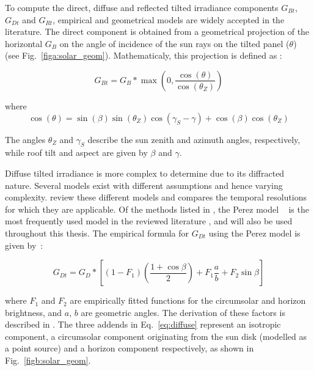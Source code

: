 To compute the direct, diffuse and reflected tilted irradiance components $G_{Bt}$, $G_{Dt}$ and $G_{Rt}$, empirical and geometrical models are widely accepted in the literature. 
The direct component is obtained from a geometrical projection of the horizontal $G_B$ on the angle of incidence of the sun rays on the tilted panel ($\theta$) (see Fig.~\ref{figa:solar_geom}). Mathematicaly, this projection is defined as \cite{gulin_estimation_2013}:

\begin{equation}
\label{eq:direct}
    G_{Bt} = G_{B} * \max \left( 0, \frac{\cos(\theta)}{\cos(\theta_Z)} \right)
\end{equation}

where
\begin{equation}
\label{eq:dir_angle}
\cos(\theta) = \sin(\beta) \sin(\theta_Z) \cos(\gamma_S - \gamma) + \cos(\beta) \cos(\theta_Z) 
\end{equation}

The angles $\theta_Z$ and $\gamma_S$ describe the sun zenith and azimuth angles, respectively, while roof tilt and aspect are given by $\beta$ and $\gamma$.

Diffuse tilted irradiance is more complex to determine due to its diffracted nature. Several models exist with different assumptions and hence varying complexity. \citet{assouline_estimation_2017} review these different models and compares the temporal resolutions for which they are applicable.
Of the methods listed in \citet{assouline_estimation_2017} , the Perez model ~\cite{perez_modeling_1990} is the most frequently used model in the reviewed literature \cite{buffat_scalable_2018,jakubiec_method_2013,mainzer_assessment_2017,wegertseder_combining_2016}, and will also be used throughout this thesis.
The empirical formula for $G_{Dt}$ using the Perez model is given by~\cite{perez_modeling_1990}:

\begin{equation}
\label{eq:diffuse}
G_{Dt} = G_D * \left[ (1 - F_1) \left( \frac{1 + \cos \beta}{2} \right) 
       + F_1 \frac{ a }{ b }
       + F_2 \sin \beta \right]
\end{equation}

where $F_1$ and $F_2$ are empirically fitted functions for the circumsolar and horizon brightness, and $a$, $b$ are geometric angles. The derivation of these factors is described in \cite{loutzenhiser_empirical_2007}. The three addends in Eq.~\ref{eq:diffuse} represent an isotropic component, a circumsolar component originating from the sun disk (modelled as a point source) and a horizon component respectively, as shown in Fig.~\ref{figb:solar_geom}.

